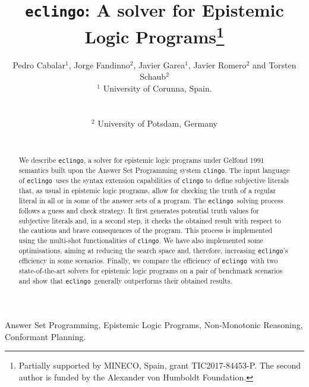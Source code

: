 \documentclass{new_tlp}
\def\eclingo{{\tt eclingo}}
\def\clingo{{\tt clingo}}
\begin{document}
\submitted{}
\revised{}
\accepted{}
\title[A solver for Epistemic Logic Programs]
    {\eclingo: A solver for Epistemic Logic Programs\thanks{Partially supported by MINECO, Spain, grant TIC2017-84453-P.
    The second author is funded by the Alexander von Humboldt Foundation.}}

  \author[P. Cabalar, J. Fandinno, J. Garea, J. Romero and T. Schaub]
         {Pedro Cabalar$^1$, Jorge Fandinno$^2$, Javier Garea$^1$, Javier Romero$^2$ and Torsten Schaub$^2$\\
          $^1$ University of Corunna, Spain.\\
          {}\\\\
          $^2$ University of Potsdam, Germany\\
          {}\\
        }


\maketitle

\begin{abstract}
We describe \eclingo, a solver for epistemic logic programs under Gelfond 1991 semantics built upon the Answer Set Programming system \clingo.
The input language of \eclingo\ uses the syntax extension capabilities of \clingo{} to define subjective literals that, as usual in
epistemic logic programs, allow for checking the truth of a regular literal in all or in some of the answer sets of a program.
The \eclingo\ solving process follows a guess and check strategy.
It first generates potential truth values for subjective literals and, in a second step, it checks the obtained result with respect to the cautious and brave consequences of the program.
This process is implemented using the multi-shot functionalities of \clingo.
We have also implemented some optimisations, aiming at reducing the search space and, therefore, increasing \eclingo's efficiency in some scenarios.
Finally, we compare the efficiency of \eclingo\ with two state-of-the-art solvers for epistemic logic programs on a pair of benchmark scenarios
and show that \eclingo\ generally outperforms their obtained results.
\end{abstract}
\begin{keywords}
Answer Set Programming, Epistemic Logic Programs, Non-Monotonic Reasoning, Conformant Planning.
\end{keywords}
\end{document}

